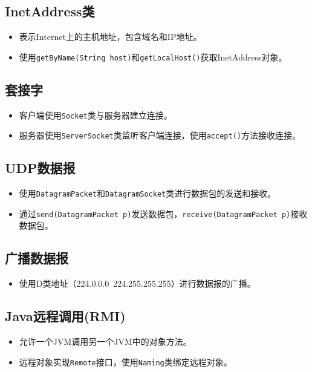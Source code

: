 \documentclass[a4paper, 10pt]{ctexart}
\begin{document}
\subsection{InetAddress类}
\begin{itemize}
  \item 表示Internet上的主机地址，包含域名和IP地址。
  \item 使用\texttt{getByName(String host)}和\texttt{getLocalHost()}获取InetAddress对象。
\end{itemize}

\subsection{套接字}
\begin{itemize}
  \item 客户端使用\texttt{Socket}类与服务器建立连接。
  \item 服务器使用\texttt{ServerSocket}类监听客户端连接，使用\texttt{accept()}方法接收连接。
\end{itemize}

\subsection{UDP数据报}
\begin{itemize}
  \item 使用\texttt{DatagramPacket}和\texttt{DatagramSocket}类进行数据包的发送和接收。
  \item 通过\texttt{send(DatagramPacket p)}发送数据包，\texttt{receive(DatagramPacket p)}接收数据包。
\end{itemize}

\subsection{广播数据报}
\begin{itemize}
  \item 使用D类地址（224.0.0.0~224.255.255.255）进行数据报的广播。
\end{itemize}

\subsection{Java远程调用(RMI)}
\begin{itemize}
  \item 允许一个JVM调用另一个JVM中的对象方法。
  \item 远程对象实现\texttt{Remote}接口，使用\texttt{Naming}类绑定远程对象。
\end{itemize}
\end{document}
